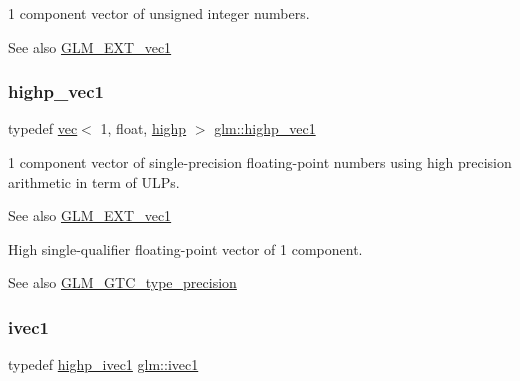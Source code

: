 1 component vector of unsigned integer numbers.

\begin{DoxySeeAlso}{See also}
\mbox{\hyperlink{group__ext__vec1}{G\+L\+M\+\_\+\+E\+X\+T\+\_\+vec1}} 
\end{DoxySeeAlso}
\mbox{\label{group__ext__vec1_gad8ebf6f2ad36cc3167e77f82b4ae9390}} 
\subsubsection{\texorpdfstring{highp\+\_\+vec1}{highp\_vec1}}
{\footnotesize\ttfamily typedef \mbox{\hyperlink{structglm_1_1vec}{vec}}$<$ 1, float, \mbox{\hyperlink{namespaceglm_a36ed105b07c7746804d7fdc7cc90ff25ac6f7eab42eacbb10d59a58e95e362074}{highp}} $>$ \mbox{\hyperlink{group__ext__vec1_gad8ebf6f2ad36cc3167e77f82b4ae9390}{glm\+::highp\+\_\+vec1}}}

1 component vector of single-\/precision floating-\/point numbers using high precision arithmetic in term of U\+L\+Ps.

\begin{DoxySeeAlso}{See also}
\mbox{\hyperlink{group__ext__vec1}{G\+L\+M\+\_\+\+E\+X\+T\+\_\+vec1}}
\end{DoxySeeAlso}
High single-\/qualifier floating-\/point vector of 1 component. \begin{DoxySeeAlso}{See also}
\mbox{\hyperlink{group__gtc__type__precision}{G\+L\+M\+\_\+\+G\+T\+C\+\_\+type\+\_\+precision}} 
\end{DoxySeeAlso}
\mbox{\label{group__ext__vec1_ga946031cea0c22745848ebd873e6facb0}} 
\subsubsection{\texorpdfstring{ivec1}{ivec1}}
{\footnotesize\ttfamily typedef \mbox{\hyperlink{group__ext__vec1_gac44dcd92c25ab0d3f5c514137d5460d8}{highp\+\_\+ivec1}} \mbox{\hyperlink{group__ext__vec1_ga946031cea0c22745848ebd873e6facb0}{glm\+::ivec1}}}

